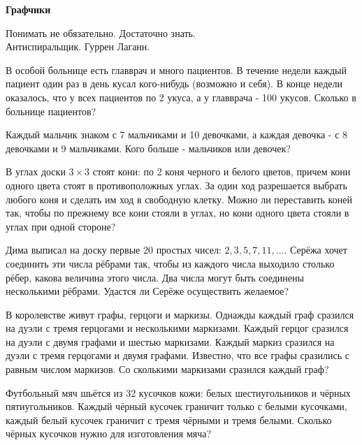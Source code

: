 \centerline{\bf \Huge Графчики}
\centerline{\bf \Huge }

\begin{flushright}
        \scriptsize{Понимать не обязательно. Достаточно знать.\\Антиспиральщик. Гуррен Лаганн.}
\end{flushright}

В особой больнице есть главврач и много пациентов. В течение недели каждый пациент один раз в день кусал кого-нибудь (возможно и себя). В конце недели оказалось, что у всех пациентов по 2 укуса, а у главврача - 100 укусов. Сколько в больнице пациентов?

Каждый мальчик знаком с 7 мальчиками и 10 девочками, а каждая девочка - с 8 девочками и 9 мальчиками. Кого больше - мальчиков или девочек?

В углах доски $3 \times 3$ стоят кони: по 2 коня черного и белого цветов, причем кони одного цвета стоят в противоположных углах. За один ход разрешается выбрать любого коня и сделать им ход в свободную клетку. Можно ли переставить коней так, чтобы по прежнему все кони стояли в углах, но кони одного цвета стояли в углах при одной стороне?

Дима выписал на доску первые 20 простых чисел: $2,3,5,7,11, \ldots$. Серёжа хочет соединить эти числа рёбрами так, чтобы из каждого числа выходило столько рёбер, какова величина этого числа. Два числа могут быть соединены несколькими рёбрами. Удастся ли Серёже осуществить желаемое?

В королевстве живут графы, герцоги и маркизы. Однажды каждый граф сразился на дуэли с тремя герцогами и несколькими маркизами. Каждый герцог сразился на дуэли с двумя графами и шестью маркизами. Каждый маркиз сразился на дуэли с тремя герцогами и двумя графами. Известно, что все графы сразились с равным числом маркизов. Со сколькими маркизами сразился каждый граф?

Футбольный мяч шьётся из 32 кусочков кожи: белых шестиугольников и чёрных пятиугольников. Каждый чёрный кусочек граничит только с белыми кусочками, каждый белый кусочек граничит с тремя чёрными и тремя белыми. Сколько чёрных кусочков нужно для изготовления мяча?